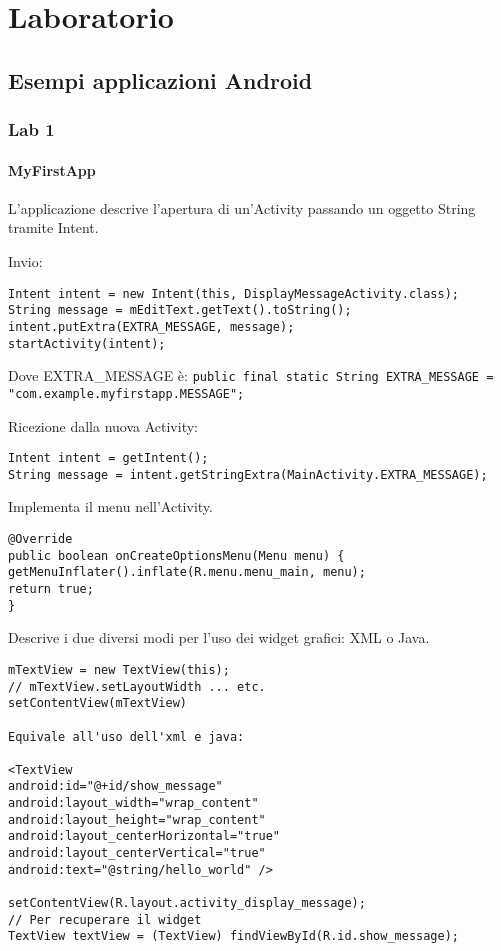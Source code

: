 \part{Laboratorio}

\chapter{Esempi applicazioni Android}


\section{Lab 1}
\subsection{MyFirstApp}
L'applicazione descrive l'apertura di un'Activity passando un oggetto String tramite Intent.

Invio:
\begin{lstlisting}
Intent intent = new Intent(this, DisplayMessageActivity.class);
String message = mEditText.getText().toString();
intent.putExtra(EXTRA_MESSAGE, message);
startActivity(intent);
\end{lstlisting}

Dove EXTRA_MESSAGE è:
\lstinline|public final static String EXTRA_MESSAGE = "com.example.myfirstapp.MESSAGE";|

Ricezione dalla nuova Activity:
\begin{lstlisting}
Intent intent = getIntent();
String message = intent.getStringExtra(MainActivity.EXTRA_MESSAGE);
\end{lstlisting}


Implementa il menu nell'Activity.
\begin{lstlisting}
@Override
public boolean onCreateOptionsMenu(Menu menu) {
getMenuInflater().inflate(R.menu.menu_main, menu);
return true;
}
\end{lstlisting}


Descrive i due diversi modi per l'uso dei widget grafici: XML o Java.
\begin{lstlisting}
mTextView = new TextView(this);
// mTextView.setLayoutWidth ... etc.
setContentView(mTextView)

Equivale all'uso dell'xml e java:

<TextView
android:id="@+id/show_message"
android:layout_width="wrap_content"
android:layout_height="wrap_content"
android:layout_centerHorizontal="true"
android:layout_centerVertical="true"
android:text="@string/hello_world" />

setContentView(R.layout.activity_display_message);
// Per recuperare il widget
TextView textView = (TextView) findViewById(R.id.show_message);
\end{lstlisting}

